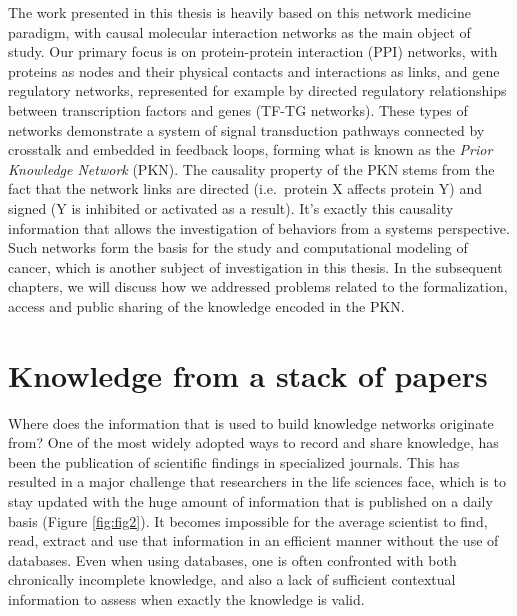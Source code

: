 \documentclass[
  12pt,
]{book}
\begin{document}
The work presented in this thesis is heavily based on this network medicine paradigm, with causal molecular interaction networks as the main object of study.
Our primary focus is on protein-protein interaction (PPI) networks, with proteins as nodes and their physical contacts and interactions as links, and gene regulatory networks, represented for example by directed regulatory relationships between transcription factors and genes (TF-TG networks).
These types of networks demonstrate a system of signal transduction pathways connected by crosstalk and embedded in feedback loops, forming what is known as the \emph{Prior Knowledge Network} (PKN).
The causality property of the PKN stems from the fact that the network links are directed (i.e.~protein X affects protein Y) and signed (Y is inhibited or activated as a result).
It's exactly this causality information that allows the investigation of behaviors from a systems perspective.
Such networks form the basis for the study and computational modeling of cancer, which is another subject of investigation in this thesis.
In the subsequent chapters, we will discuss how we addressed problems related to the formalization, access and public sharing of the knowledge encoded in the PKN.

\newpage

\hypertarget{knowledge-from-a-stack-of-papers}{%
\section*{Knowledge from a stack of papers}\label{knowledge-from-a-stack-of-papers}}

\indent

Where does the information that is used to build knowledge networks originate from?
One of the most widely adopted ways to record and share knowledge, has been the publication of scientific findings in specialized journals.
This has resulted in a major challenge that researchers in the life sciences face, which is to stay updated with the huge amount of information that is published on a daily basis (Figure \ref{fig:fig2}).
It becomes impossible for the average scientist to find, read, extract and use that information in an efficient manner without the use of databases.
Even when using databases, one is often confronted with both chronically incomplete knowledge, and also a lack of sufficient contextual information to assess when exactly the knowledge is valid.
\end{document}
